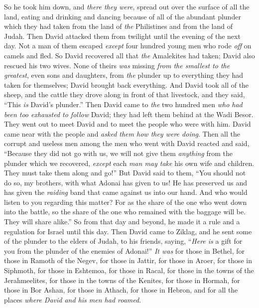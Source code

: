 \begin{biblechapter}
\verse So he took him down, and \textit{there they were}, spread out over the surface of all the land, eating and drinking and dancing because of all of the abundant plunder which they had taken from the land of \textit{the} Philistines and from the land of Judah.
\verse Then David attacked them from twilight until the evening of the next day. Not a man of them escaped \textit{except} four hundred young men who rode \textit{off} on camels and fled.
\verse So David recovered all that \textit{the} Amalekites had taken; David also rescued his two wives.
\verse None of theirs \textit{was} missing \textit{from the smallest to the greatest}, even sons and daughters, from \textit{the} plunder up to everything they had taken for themselves; David brought back everything.
\verse And David took all of the sheep, and the cattle they drove along in front of that livestock, and they said, “This \textit{is} David’s plunder.”
\verse Then David came to \textit{the} two hundred men \textit{who had been too exhausted to follow} David; they had left them behind at the Wadi Besor. They went out to meet David and to meet the people who were with him. David came near with the people and \textit{asked them how they were doing}.
\verse Then all the corrupt and useless men among the men who went with David reacted and said, “Because they did not go with us, we will not give them \textit{anything} from the plunder which we recovered, \textit{except} each \textit{man may take} his own wife and children. They must take them along and go!”
\verse But David said to them, “You should not do so, my brothers, with what Adonai has given to us! He has preserved us and has given the \textit{raiding} band that came against us into our hand.
\verse And who would listen to you regarding this matter? For as the share of the one who went down into the battle, so the share of the one who remained with the baggage will be. They will share alike.”
\verse So from that day and beyond, he made it a rule and a regulation for Israel until this day.
\verse Then David came to Ziklag, and he sent some of the plunder to the elders of Judah, to his friends, saying, “\textit{Here is} a gift for you from the plunder of the enemies of Adonai!”
\verse \textit{It was} for those in Bethel, for those in Ramoth of the Negev, for those in Jattir,
\verse for those in Aroer, for those in Siphmoth, for those in Eshtemoa,
\verse for those in Racal, for those in the towns of the Jerahmeelites, for those in the towns of the Kenites,
\verse for those in Hormah, for those in Bor Ashan, for those in Athach,
\verse for those in Hebron, and for all the places \textit{where David and his men had roamed}.
\end{biblechapter}

